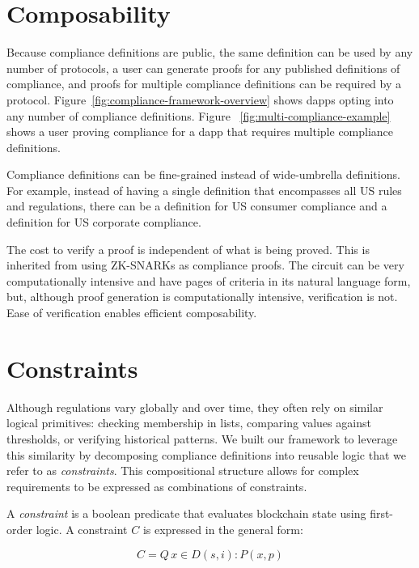 \documentclass[9pt]{extreport}
\begin{document}
\section{Composability} 
Because compliance definitions are public, the same definition can be used by any number of protocols, a user can generate proofs for any published definitions of compliance, and proofs for multiple compliance definitions can be required by a protocol.  Figure~\ref{fig:compliance-framework-overview} shows dapps opting into any number of compliance definitions.  Figure ~\ref{fig:multi-compliance-example} shows a user proving compliance for a dapp that requires multiple compliance definitions.

Compliance definitions can be fine-grained instead of wide-umbrella definitions.  For example, instead of having a single definition that encompasses all US rules and regulations, there can be a definition for US consumer compliance and a definition for US corporate compliance.

The cost to verify a proof is independent of what is being proved.  This is inherited from using ZK-SNARKs as compliance proofs.  The circuit can be very computationally intensive and have pages of criteria in its natural language form, but, although proof generation is computationally intensive, verification is not.  Ease of verification enables efficient composability.

\section{Constraints}
\label{sec:constraints}
Although regulations vary globally and over time, they often rely on similar logical primitives: checking membership in lists, comparing values against thresholds, or verifying historical patterns. We built our framework to leverage this similarity by decomposing compliance definitions into reusable logic that we refer to as \textit{constraints}.  This compositional structure allows for complex requirements to be expressed as combinations of constraints.
 
A \textit{constraint} is a boolean predicate that evaluates blockchain state using first-order logic. A constraint $C$ is expressed in the general form:

$$C = Q \, x \in D(s, i) : P(x, p)$$
\end{document}
